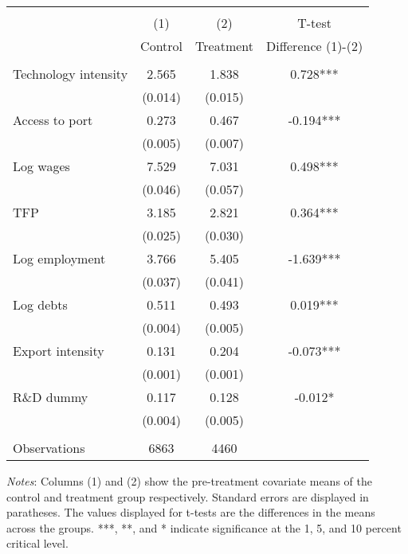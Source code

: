 
\begin{threeparttable}
\begin{tabular}{lccc}
\\[-1.8ex]\toprule \toprule \\[-1.8ex]
 & (1)  & (2)  & T-test  \\
 & Control  & Treatment  & Difference (1)-(2) \\ \midrule \\[-1.8ex] 
Technology intensity & 2.565 &  1.838 	& 0.728***		\\
				& (0.014) 	& (0.015) 	& 				\\
Access to port 	& 0.273 	& 0.467 	&  -0.194***	\\ 
				& (0.005) 	& (0.007)	& 				\\
Log wages		&  7.529 	& 7.031 	& 0.498*** 		\\ 
				& (0.046)	& (0.057) 	&  				\\
TFP 			& 3.185		& 2.821		& 0.364***		\\ 
				& (0.025) 	& (0.030)  	&				\\
Log employment 	& 3.766 	& 5.405 	& -1.639***		\\
				& (0.037) 	& (0.041)  	&				\\
Log debts 		& 0.511 	& 0.493 	& 0.019***		\\ 
				& (0.004) 	& (0.005)	&			   	\\
Export intensity &  0.131 	&  0.204 	& -0.073*** 	\\ 
				& (0.001) 	& (0.001) 	&				\\
R\&D dummy 		& 0.117 	& 0.128 	& -0.012*		\\ 
				& (0.004) 	& (0.005) 	&  				\\ \\[-1.8ex]
Observations 	& 6863 		& 4460 		&				\\
\bottomrule \bottomrule 
\end{tabular} 

\begin{tablenotes}[flushleft]
\footnotesize
\item \textit{Notes}: Columns (1) and (2) show the pre-treatment covariate means of the control and treatment group respectively. Standard errors are displayed in paratheses. The values displayed for t-tests are the differences in the means across the groups. ***, **, and * indicate significance at the 1, 5, and 10 percent critical level.
\end{tablenotes}

\end{threeparttable}

